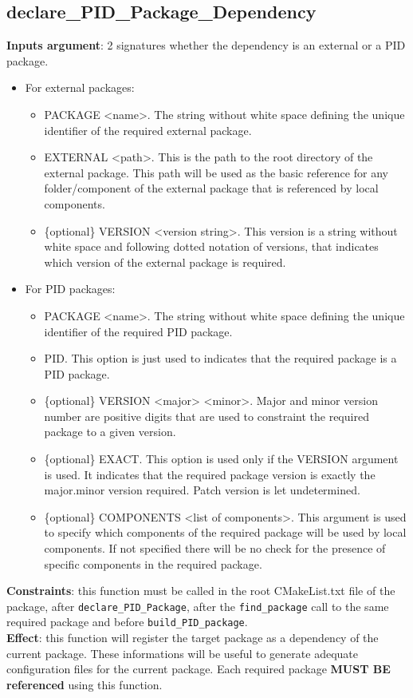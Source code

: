 \documentclass[12pt,a4paper]{article}
\begin{document}
\subsection{declare\_PID\_Package\_Dependency}
\textbf{Inputs argument}: 2 signatures whether the dependency is an external or a PID package.
\begin{itemize}
\item For external packages:
\begin{itemize}
\item PACKAGE <name>. The string without white space defining the unique identifier of the required external package.
\item EXTERNAL <path>. This is the path to the root directory of the external package. This path will be used as the basic reference for any folder/component of the external package that is referenced by local components.
\item \{optional\} VERSION <version string>. This version is a string without white space and following dotted notation of versions, that indicates which version of the external package is required.
\end{itemize}
\item For PID packages:
\begin{itemize}
\item PACKAGE <name>. The string without white space defining the unique identifier of the required PID package.
\item PID. This option is just used to indicates that the required package is a PID package.
\item \{optional\} VERSION <major> <minor>. Major and minor version number are positive digits that are used to constraint the required package to a given version.
\item \{optional\} EXACT. This option is used only if the VERSION argument is used. It indicates that the required package version is exactly the major.minor version required. Patch version is let undetermined.
\item \{optional\} COMPONENTS <list of components>. This argument is used to specify which components of the required package will be used by local components. If not specified there will be no check for the presence of specific components in the required package.
\end{itemize}
\end{itemize}
\textbf{Constraints}: this function must be called in the root CMakeList.txt file of the package, after \texttt{declare\_PID\_Package}, after the \texttt{find\_package} call to the same required package and before \texttt{build\_PID\_package}.\\
\textbf{Effect}: this function will register the target package as a dependency of the current package. These informations will be useful to generate adequate configuration files for the current package. Each required package \textbf{MUST BE referenced} using this function.
\end{document}
